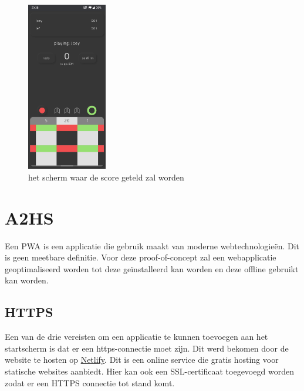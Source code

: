 	\begin{figure}[H]
		\centering
		\includegraphics[width=35mm]{./img/dart4.jpg}{}
		\caption{het scherm waar de score geteld zal worden}
	\end{figure}
	


\section{A2HS}

	Een PWA is een applicatie die gebruik maakt van moderne webtechnologieën. Dit is geen meetbare definitie. 
	Voor deze proof-of-concept zal een webapplicatie geoptimaliseerd worden tot deze geïnstalleerd kan worden en deze offline gebruikt kan worden.
	

	\subsection{HTTPS}

		Een van de drie vereisten om een applicatie te kunnen toevoegen aan het startscherm is dat er een https-connectie moet zijn. Dit werd bekomen door de website te hosten op \href{https://www.netlify.com/}{ Netlify}. Dit is een online service die gratis hosting voor statische websites aanbiedt. Hier kan ook een SSL-certificaat toegevoegd worden zodat er een HTTPS connectie tot stand komt.


